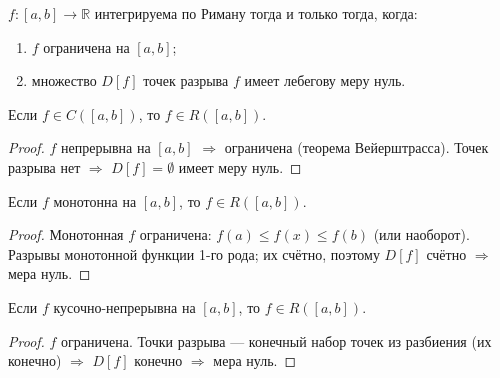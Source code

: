 \begin{theorem}
  $f: [a,b] \to \mathbb{R}$ интегрируема по Риману тогда и только тогда, когда:
  \begin{enumerate}
    \item $f$ ограничена на $[a,b]$;
    \item множество $D[f]$ точек разрыва $f$ имеет лебегову меру нуль.
  \end{enumerate}
\end{theorem}

\begin{corollary}
  Если $f \in C([a,b])$, то $f \in R([a,b])$.
  \begin{proof}
    $f$ непрерывна на $[a,b]$ $\Rightarrow$ ограничена (теорема Вейерштрасса).
    Точек разрыва нет $\Rightarrow$ $D[f] = \emptyset$ имеет меру нуль. \qedhere
  \end{proof}
\end{corollary}

\begin{corollary}
  Если $f$ монотонна на $[a,b]$, то $f \in R([a,b])$.
  \begin{proof}
    Монотонная $f$ ограничена: $f(a) \leq f(x) \leq f(b)$ (или наоборот).
    Разрывы монотонной функции 1-го рода; их счётно, поэтому $D[f]$ счётно
    $\Rightarrow$ мера нуль. \qedhere
  \end{proof}
\end{corollary}

\begin{corollary}
  Если $f$ кусочно-непрерывна на $[a,b]$, то $f \in R([a,b])$.
  \begin{proof}
    $f$ ограничена. Точки разрыва --- конечный набор точек из разбиения (их конечно)
    $\Rightarrow$ $D[f]$ конечно $\Rightarrow$ мера нуль. \qedhere
  \end{proof}
\end{corollary}
